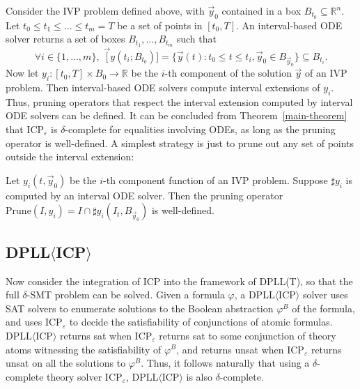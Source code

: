 \documentclass[prodmode]{acmsmall} %
\begin{document}
Consider the IVP problem defined above, with $\vec y_0$ contained in a box $B_{t_0}\subseteq \mathbb{R}^n$. Let $t_0\leq t_1\leq ...\leq t_m = T$ be a set of points in $[t_0, T]$. An interval-based ODE solver returns a set of boxes $B_{t_1},...,B_{t_m}$ such that 
$$\forall i\in \{1,...,m\},\; \vec [y(t_i; B_{t_0})] = \{\vec y(t): t_0\leq t\leq t_i, \vec y_0\in B_{\vec y_0}\}\subseteq B_{t_i}.$$
Now let $y_i: [t_0, T]\times B_0 \rightarrow \mathbb{R}$ be the $i$-th component of the solution $\vec y$ of an IVP problem. Then interval-based ODE solvers compute interval extensions of $y_i$. 
Thus, pruning operators that respect the interval extension computed by interval ODE solvers can be defined. It can be concluded from Theorem~\ref{main-theorem} that ICP$_{\varepsilon}$ is $\delta$-complete for equalities involving ODEs, as long as the pruning operator is well-defined. A simplest strategy is just to prune out any set of points outside the interval extension:
\begin{proposition}
Let $y_i(t,\vec y_0)$ be the $i$-th component function of an IVP problem. Suppose $\sharp y_i$ is computed by an interval ODE solver. Then the pruning operator $\mathrm{Prune}(I, y_i) = I\cap \sharp y_i(I_t, B_{\vec y_0})$ is well-defined. 
\end{proposition}
\subsection{DPLL$\langle$ICP$\rangle$}
Now consider the integration of ICP into the framework of DPLL(T), so that the full $\delta$-SMT problem can be solved. Given a formula $\varphi$, a DPLL$\langle$ICP$\rangle$ solver uses SAT solvers to enumerate solutions to the Boolean abstraction $\varphi^B$ of the formula, and uses ICP$_{\varepsilon}$ to decide the satisfiability of conjunctions of atomic formulas. %
DPLL$\langle$ICP$\rangle$ returns {\sf sat} when ICP$_{\varepsilon}$ returns {\sf sat} to some conjunction of theory atoms witnessing the satisfiability of $\varphi^B$, and returns {\sf unsat} when ICP$_{\varepsilon}$ returns {\sf unsat} on all the solutions to $\varphi^B$. Thus, it follows naturally that using a $\delta$-complete theory solver ICP$_{\varepsilon}$, DPLL$\langle$ICP$\rangle$ is also $\delta$-complete. 
\end{document}
